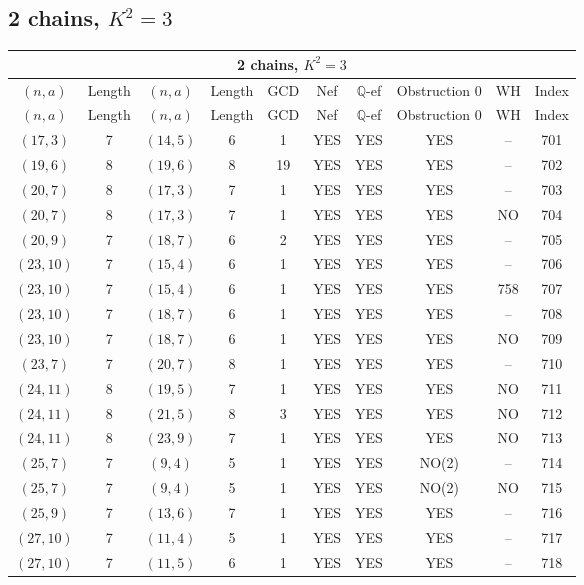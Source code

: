 \subsection{2 chains, $K^2 = 3$}
\begin{longtable}{|c|c|c|c|c|c|c|c|c|c|}
\hline
\multicolumn{10}{|c|}{2 chains, $K^2 = 3$}\\
\hline
$(n,a)$ & Length & $(n,a)$ & Length & GCD & Nef & $\mathbb Q$-ef & Obstruction 0 & WH & Index\\
\hline
\endfirsthead

\hline
$(n,a)$ & Length & $(n,a)$ & Length & GCD & Nef & $\mathbb Q$-ef & Obstruction 0 & WH & Index\\
\hline
\endhead
\hline
\endfoot

$(17, 3)$ & 7 & $(14, 5)$ & 6 & 1 & YES & YES & YES & -- & 701\\
$(19, 6)$ & 8 & $(19, 6)$ & 8 & 19 & YES & YES & YES & -- & 702\\
$(20, 7)$ & 8 & $(17, 3)$ & 7 & 1 & YES & YES & YES & -- & 703\\
$(20, 7)$ & 8 & $(17, 3)$ & 7 & 1 & YES & YES & YES & NO & 704\\
$(20, 9)$ & 7 & $(18, 7)$ & 6 & 2 & YES & YES & YES & -- & 705\\
$(23, 10)$ & 7 & $(15, 4)$ & 6 & 1 & YES & YES & YES & -- & 706\\
$(23, 10)$ & 7 & $(15, 4)$ & 6 & 1 & YES & YES & YES & 758 & 707\\
$(23, 10)$ & 7 & $(18, 7)$ & 6 & 1 & YES & YES & YES & -- & 708\\
$(23, 10)$ & 7 & $(18, 7)$ & 6 & 1 & YES & YES & YES & NO & 709\\
$(23, 7)$ & 7 & $(20, 7)$ & 8 & 1 & YES & YES & YES & -- & 710\\
$(24, 11)$ & 8 & $(19, 5)$ & 7 & 1 & YES & YES & YES & NO & 711\\
$(24, 11)$ & 8 & $(21, 5)$ & 8 & 3 & YES & YES & YES & NO & 712\\
$(24, 11)$ & 8 & $(23, 9)$ & 7 & 1 & YES & YES & YES & NO & 713\\
$(25, 7)$ & 7 & $(9, 4)$ & 5 & 1 & YES & YES & NO(2) & -- & 714\\
$(25, 7)$ & 7 & $(9, 4)$ & 5 & 1 & YES & YES & NO(2) & NO & 715\\
$(25, 9)$ & 7 & $(13, 6)$ & 7 & 1 & YES & YES & YES & -- & 716\\
$(27, 10)$ & 7 & $(11, 4)$ & 5 & 1 & YES & YES & YES & -- & 717\\
$(27, 10)$ & 7 & $(11, 5)$ & 6 & 1 & YES & YES & YES & -- & 718\\

\end{longtable}
